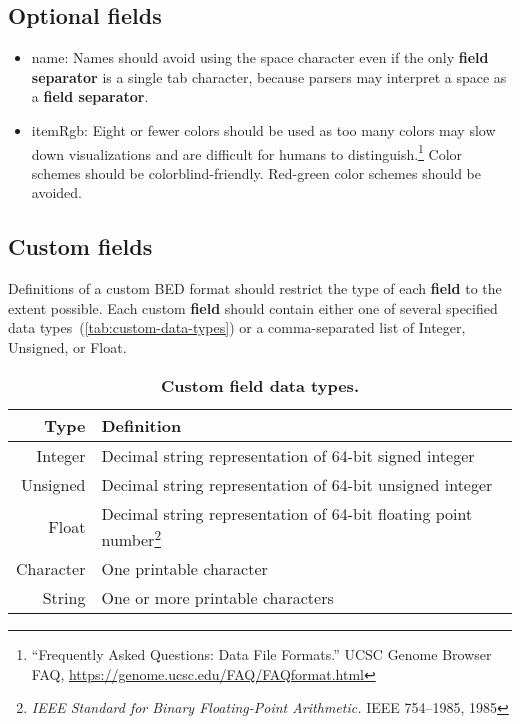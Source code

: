 \documentclass[11pt]{article}
\begin{document}
\subsection{Optional fields}\label{sec:optional}
\begin{itemize}
\item \textsf{name}: Names should avoid using the space character even if the only \textbf{field separator} is a single tab character, because parsers may interpret a space as a \textbf{field separator}.

\item \textsf{itemRgb}: Eight or fewer colors should be used as too many colors may slow down visualizations and are difficult for humans to distinguish.\footnote{``Frequently
    Asked Questions: Data File Formats.'' \ac{UCSC} Genome Browser FAQ,
    \url{https://genome.ucsc.edu/FAQ/FAQformat.html}}
  Color schemes should be colorblind-friendly.
  Red-green color schemes should be avoided.

\end{itemize}

\subsection{Custom fields}

Definitions of a custom \ac{BED} format should restrict the type of each \textbf{field} to the extent possible.
Each custom \textbf{field} should contain either one of several specified data types~(\autoref{tab:custom-data-types}) or a comma-separated list of Integer, Unsigned, or Float.

\begin{savenotes}
  \begin{table}
    \begin{tabularx}{\textwidth}{r L}
      \toprule
      Type & Definition \\
      \midrule
      Integer & Decimal string representation of 64-bit signed integer \\
      Unsigned & Decimal string representation of 64-bit unsigned integer \\
      Float & Decimal string representation of 64-bit floating point number\footnote{\emph{IEEE Standard for Binary Floating-Point Arithmetic.}
              IEEE 754--1985, 1985} \\
      Character & One printable character \\
      String & One or more printable characters \\
      \bottomrule
    \end{tabularx}
    \caption{\textbf{Custom field data types.}}\label{tab:custom-data-types}
  \end{table}
\end{savenotes}
\end{document}
